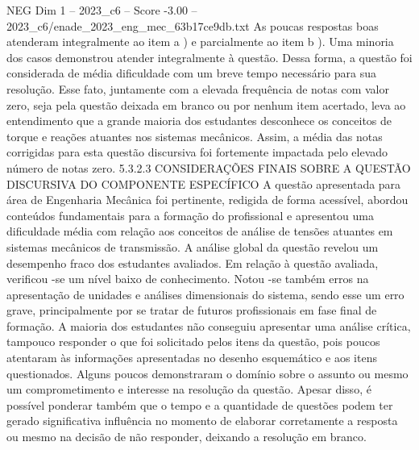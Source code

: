 \begin{textsample}{NEG Dim 1 – 2023\_c6 – Score -3.00 – 2023\_c6/enade\_2023\_eng\_mec\_63b17ce9db.txt}
As poucas respostas boas atenderam integralmente ao item a ) e parcialmente ao item b ).
Uma minoria dos casos demonstrou atender integralmente à questão.
Dessa forma, a questão foi considerada de média dificuldade com um breve tempo necessário para sua resolução.
Esse fato, juntamente com a elevada frequência de notas com valor zero, seja pela questão deixada em branco ou por nenhum item acertado, leva ao entendimento que a grande maioria dos estudantes desconhece os conceitos de torque e reações atuantes nos sistemas mecânicos.
Assim, a média das notas corrigidas para esta questão discursiva foi fortemente impactada pelo elevado número de notas zero. 5.3.2.3 CONSIDERAÇÕES FINAIS SOBRE A QUESTÃO DISCURSIVA DO COMPONENTE ESPECÍFICO A questão apresentada para área de Engenharia Mecânica foi pertinente, redigida de forma acessível, abordou conteúdos fundamentais para a formação do profissional e apresentou uma dificuldade média com relação aos conceitos de análise de tensões atuantes em sistemas mecânicos de transmissão.
A análise global da questão revelou um desempenho fraco dos estudantes avaliados.
Em relação à questão avaliada, verificou -se um nível baixo de conhecimento.
Notou -se também erros na apresentação de unidades e análises dimensionais do sistema, sendo esse um erro grave, principalmente por se tratar de futuros profissionais em fase final de formação.
A maioria dos estudantes não conseguiu apresentar uma análise crítica, tampouco responder o que foi solicitado pelos itens da questão, pois poucos atentaram às informações apresentadas no desenho esquemático e aos itens questionados.
Alguns poucos demonstraram o domínio sobre o assunto ou mesmo um comprometimento e interesse na resolução da questão.
Apesar disso, é possível ponderar também que o tempo e a quantidade de questões podem ter gerado significativa influência no momento de elaborar corretamente a resposta ou mesmo na decisão de não responder, deixando a resolução em branco.

\end{textsample}
